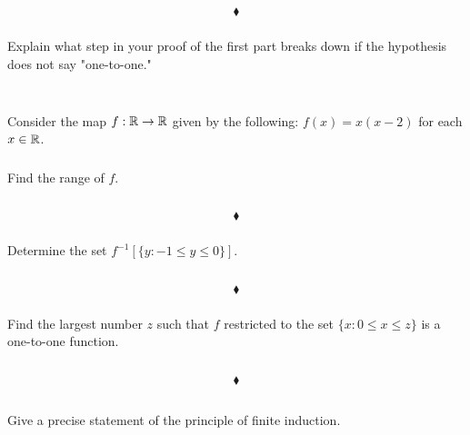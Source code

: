 $$\blacklozenge$$

\subsubsection{}
\begin{tcolorbox}
Explain what step in your proof of the first part breaks down if the hypothesis does not say "one-to-one." 
\end{tcolorbox}
$$ $$


\renewcommand{\thesubsection}{\thesection.\RomanNumeralCaps{6}}
\subsection{}
Consider the map $f:\mathbb{R}\rightarrow \mathbb{R}$ given by the following: $f(x)=x(x - 2)$ for each $x \in \mathbb{R}$. 
\subsubsection{}
\begin{tcolorbox}
Find the range of $f$.
\end{tcolorbox}
$$ $$

$$\blacklozenge$$

\subsubsection{}
\begin{tcolorbox}
Determine the set $f^{-1}\left[\{y:-1\leq y\leq 0\}\right]$. 
\end{tcolorbox}
$$ $$

$$\blacklozenge$$

\subsubsection{}
\begin{tcolorbox} 
Find the largest number $z$ such that $f$ restricted to the set $\{x :0\leq x \leq z\}$ is a one-to-one function. 
\end{tcolorbox}
$$ $$

$$\blacklozenge$$




\renewcommand{\thesubsection}{\thesection.\RomanNumeralCaps{7}}
\subsection{}
\subsubsection{}
\begin{tcolorbox}
Give a precise statement of the principle of finite induction.  
\end{tcolorbox}
$$ $$

